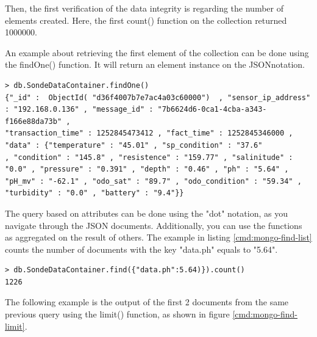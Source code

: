 Then, the first verification of the data integrity is regarding the number of
elements created. Here, the first count() function on the collection returned
1000000.

An example about retrieving the first element of the collection can be done
using the findOne() function. It will return an element instance on the
JSONnotation.

\lstset{label=cmd:mongo-findone,caption=Querying the database: one item}
\begin{lstlisting}
> db.SondeDataContainer.findOne()
{"_id" :  ObjectId( "d36f4007b7e7ac4a03c60000")  , "sensor_ip_address" : "192.168.0.136" , "message_id" : "7b6624d6-0ca1-4cba-a343-f166e88da73b" ,
"transaction_time" : 1252845473412 , "fact_time" : 1252845346000 , "data" : {"temperature" : "45.01" , "sp_condition" : "37.6"
, "condition" : "145.8" , "resistence" : "159.77" , "salinitude" : "0.0" , "pressure" : "0.391" , "depth" : "0.46" , "ph" : "5.64" ,
"pH_mv" : "-62.1" , "odo_sat" : "89.7" , "odo_condition" : "59.34" , "turbidity" : "0.0" , "battery" : "9.4"}}
\end{lstlisting}

The query based on attributes can be done using the "dot" notation, as you
navigate through the JSON documents. Additionally, you can use the functions as
aggregated on the result of others. The example in listing
\ref{cmd:mongo-find-list} counts the number of documents with the key
"data.ph" equals to "5.64".

\lstset{label=cmd:mongo-find-list,caption=Execution of mongo client}
\begin{lstlisting}
> db.SondeDataContainer.find({"data.ph":5.64)}).count()
1226
\end{lstlisting}

The following example is the output of the first 2 documents from the same
previous query using the limit() function, as shown in figure
\ref{cmd:mongo-find-limit}.

